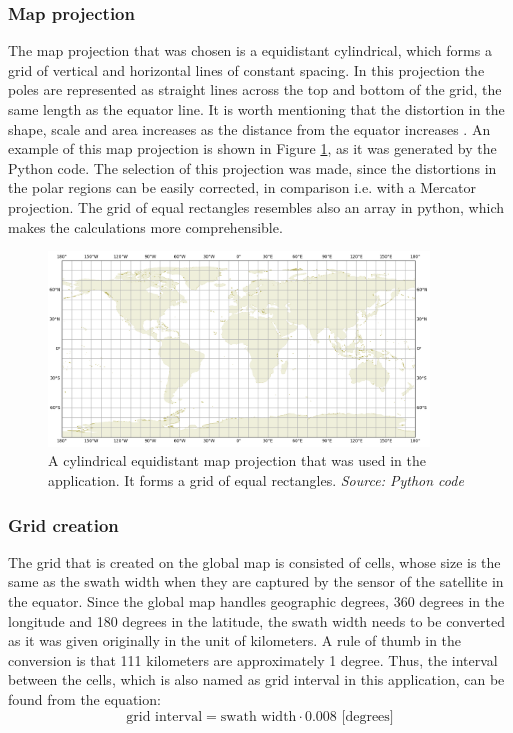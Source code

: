 \bigskip
\subsubsection{Map projection}
\bigskip

The map projection that was chosen is a equidistant cylindrical, which forms a grid of vertical and horizontal lines of constant spacing. In this projection the poles are represented as straight lines across the top and bottom of the grid, the same length as the equator line. It is worth mentioning that the distortion in the shape, scale and area increases as the distance from the equator increases \cite{Lapaine}. An example of this map projection is shown in Figure \ref{map_projection}, as it was generated by the Python code. The selection of this projection was made, since the distortions in the polar regions can be easily corrected, in comparison i.e. with a Mercator projection. The grid of equal rectangles resembles also an array in python, which makes the calculations more comprehensible.

\begin{figure}
\centering
\includegraphics[width=0.9\textwidth]{Images/map_projection.png}\caption{A cylindrical equidistant map projection that was used in the application. It forms a grid of equal rectangles. \textit{Source: Python code}}
\label{map_projection}
\end{figure}

\bigskip
\subsubsection{Grid creation}
\bigskip

The grid that is created on the global map is consisted of cells, whose size is the same as the swath width when they are captured by the sensor of the satellite in the equator. Since the global map handles geographic degrees, 360 degrees in the longitude and 180 degrees in the latitude, the swath width needs to be converted as it was given originally in the unit of kilometers. A rule of thumb in the conversion is that 111 kilometers are approximately 1 degree. Thus, the interval between the cells, which is also named as grid interval in this application, can be found from the equation:
\begin{equation}
\label{grid_interval}
\text{grid interval} = \text{swath width} \cdot 0.008 \text{ [degrees]}
\end{equation}

